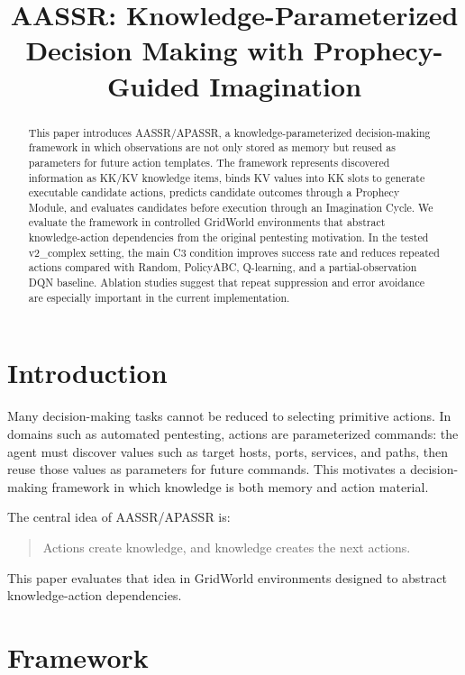 \documentclass[conference]{IEEEtran}
\title{AASSR: Knowledge-Parameterized Decision Making with Prophecy-Guided Imagination}
\author{
    \IEEEauthorblockN{Author Name}
    \IEEEauthorblockA{Affiliation\\
    Email}
}
\begin{document}
\maketitle

\begin{abstract}
This paper introduces AASSR/APASSR, a knowledge-parameterized decision-making
framework in which observations are not only stored as memory but reused as
parameters for future action templates. The framework represents discovered
information as KK/KV knowledge items, binds KV values into KK slots to generate
executable candidate actions, predicts candidate outcomes through a Prophecy
Module, and evaluates candidates before execution through an Imagination Cycle.
We evaluate the framework in controlled GridWorld environments that abstract
knowledge-action dependencies from the original pentesting motivation. In the
tested v2\_complex setting, the main C3 condition improves success rate and
reduces repeated actions compared with Random, PolicyABC, Q-learning, and a
partial-observation DQN baseline. Ablation studies suggest that repeat
suppression and error avoidance are especially important in the current
implementation.
\end{abstract}

\section{Introduction}

Many decision-making tasks cannot be reduced to selecting primitive actions.
In domains such as automated pentesting, actions are parameterized commands:
the agent must discover values such as target hosts, ports, services, and paths,
then reuse those values as parameters for future commands. This motivates a
decision-making framework in which knowledge is both memory and action material.

The central idea of AASSR/APASSR is:

\begin{quote}
Actions create knowledge, and knowledge creates the next actions.
\end{quote}

This paper evaluates that idea in GridWorld environments designed to abstract
knowledge-action dependencies.

\section{Framework}
\end{document}
